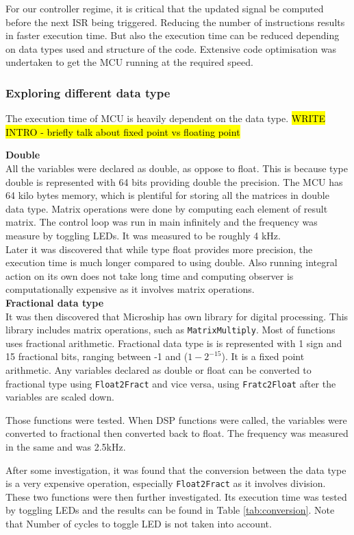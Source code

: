 For our controller regime, it is critical that the updated signal be computed before the next ISR being triggered. Reducing the number of instructions results in faster execution time. But also the execution time can be reduced depending on data types used and structure of the code. Extensive code optimisation was undertaken to get the MCU running at the required speed. 

\subsubsection{Exploring different data type}
The execution time of MCU is heavily dependent on the data type. \hl{WRITE INTRO - briefly talk about fixed point vs floating point}

\textbf{Double}\\
All the variables were declared as double, as oppose to float. This is because type double is represented with 64 bits providing double the precision. The MCU has 64 kilo bytes memory, which is plentiful for storing all the matrices in double data type. 
Matrix operations were done by computing each element of result matrix. The control loop was run in main infinitely and the frequency was measure by toggling LEDs. It was measured to be roughly 4 kHz. \\
Later it was discovered that while type float provides more precision, the execution time is much longer compared to using double. Also running integral action on its own does not take long time and computing observer is computationally expensive as it involves matrix operations. \\

\textbf{Fractional data type}\\
It was then discovered that Microship has own library for digital processing. This library includes matrix operations, such as \texttt{MatrixMultiply}. Most of functions uses fractional arithmetic. Fractional data type is is represented with 1 sign and 15 fractional bits, ranging between -1 and ($1-2^{-15}$). It is a fixed point arithmetic. Any variables declared as double or float can be converted to fractional type using \texttt{Float2Fract} and vice versa, using \texttt{Fratc2Float} after the variables are scaled down. 

Those functions were tested. When DSP functions were called, the variables were converted to fractional then converted back to float. The frequency was measured in the same and was 2.5kHz. 

After some investigation, it was found that the conversion between the data type is a very expensive operation, especially \texttt{Float2Fract} as it involves division. These two functions were then further investigated. Its execution time was tested by toggling LEDs and the results can be found in Table \ref{tab:conversion}. Note that Number of cycles to toggle LED is not taken into account. 

